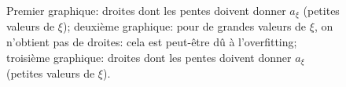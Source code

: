 \documentclass[12pt]{article}
\begin{document}
\begin{figure}[h]
\begin{center}
  \end{center}
  \caption{\label{fig:iv_verif}Premier graphique: droites dont les pentes doivent donner $a_{\xi}$ (petites valeurs de $\xi$); deuxième graphique: pour de grandes valeurs de $\xi$, on n'obtient pas de droites: cela est peut-être dû à l'overfitting; troisième graphique: droites dont les pentes doivent donner $a_{\xi}$ (petites valeurs de $\xi$).}
\end{figure}
\end{document}
